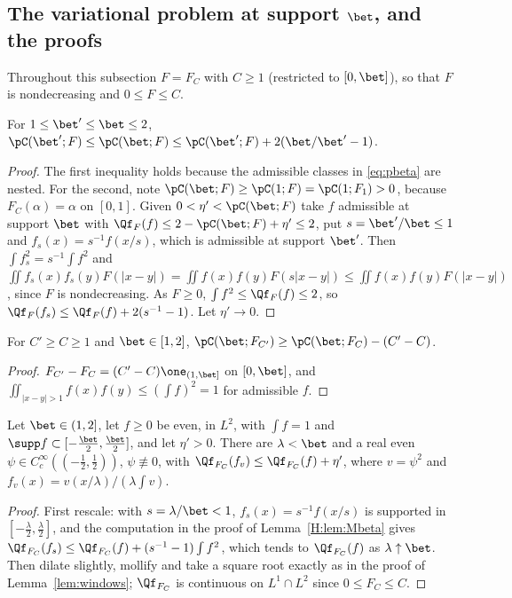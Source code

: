 \subsection{The variational problem at support \texorpdfstring{$\bet$}{lambda-bar}, and the proofs}\label{H:sec:assembly}

Throughout this subsection $F=F_C$ with $C\ge1$ (restricted to $[0,\bet]$), so that $F$ is nondecreasing and $0\le F\le C$.

\begin{lemma}\label{H:lem:Mbeta}
For $1\le\bet'\le\bet\le2$, $\pC(\bet';F)\le\pC(\bet;F)\le\pC(\bet';F)+2(\bet/\bet'-1)$.
\end{lemma}
\begin{proof}
The first inequality holds because the admissible classes in \eqref{eq:pbeta} are nested. For the second, note $\pC(\bet;F)\ge\pC(1;F)=\pC(1;F_1)>0$, because $F_C(\alpha)=\alpha$ on $[0,1]$. Given $0<\eta'<\pC(\bet;F)$ take $f$ admissible at support $\bet$ with $\Qf_F(f)\le2-\pC(\bet;F)+\eta'\le2$, put $s=\bet'/\bet\le1$ and $f_s(x)=s^{-1}f(x/s)$, which is admissible at support $\bet'$. Then $\int f_s^2=s^{-1}\int f^2$ and $\iint f_s(x)f_s(y)F(|x-y|)=\iint f(x)f(y)F(s|x-y|)\le\iint f(x)f(y)F(|x-y|)$, since $F$ is nondecreasing. As $F\ge0$, $\int f^2\le\Qf_F(f)\le2$, so $\Qf_F(f_s)\le\Qf_F(f)+2(s^{-1}-1)$. Let $\eta'\to0$.
\end{proof}

\begin{lemma}\label{H:lem:pLip}
For $C'\ge C\ge1$ and $\bet\in[1,2]$, $\pC(\bet;F_{C'})\ge\pC(\bet;F_C)-(C'-C)$.
\end{lemma}
\begin{proof}
$F_{C'}-F_C=(C'-C)\one_{(1,\bet]}$ on $[0,\bet]$, and $\iint_{|x-y|>1}f(x)f(y)\le(\int f)^2=1$ for admissible $f$.
\end{proof}

\begin{lemma}\label{H:lem:windows}
Let $\bet\in(1,2]$, let $f\ge0$ be even, in $L^2$, with $\int f=1$ and $\supp f\subset[-\frac\bet2,\frac\bet2]$, and let $\eta'>0$. There are $\lambda<\bet$ and a real even $\psi\in C_c^\infty((-\frac12,\frac12))$, $\psi\not\equiv0$, with $\Qf_{F_C}(f_v)\le\Qf_{F_C}(f)+\eta'$, where $v=\psi^2$ and $f_v(x)=v(x/\lambda)/(\lambda\int v)$.
\end{lemma}
\begin{proof}
First rescale: with $s=\lambda/\bet<1$, $f_s(x)=s^{-1}f(x/s)$ is supported in $[-\frac\lambda2,\frac\lambda2]$, and the computation in the proof of Lemma~\ref{H:lem:Mbeta} gives $\Qf_{F_C}(f_s)\le\Qf_{F_C}(f)+(s^{-1}-1)\int f^2$, which tends to $\Qf_{F_C}(f)$ as $\lambda\uparrow\bet$. Then dilate slightly, mollify and take a square root exactly as in the proof of Lemma~\ref{lem:windows}; $\Qf_{F_C}$ is continuous on $L^1\cap L^2$ since $0\le F_C\le C$.
\end{proof}

